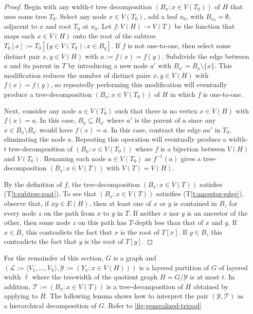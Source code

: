 \documentclass{patmorin}
\newcommand{\tref}[1]{(T\ref{t:#1})}
\begin{document}
\begin{proof}
  Begin with any width-$t$ tree decomposition $(B_x:x\in V(T_0))$ of $H$ that uses some tree $T_0$.  Select any node $x\in V(T_0)$, add a leaf $x_0$, with $B_{x_0}=\emptyset$, adjacent to $x$ and root $T_0$ at $x_0$.  Let $f:V(H)\to V(T)$ be the function that maps each $x\in V(H)$ onto the root of the subtree $T_0[x]:=T_0[\{y\in V(T_0): x\in B_y]$.  If $f$ is not one-to-one, then select some distinct pair $x,y\in V(H)$ with $a:=f(x)=f(y)$.  Subdivide the edge between $a$ and its parent in $T$ by introducing a new node $a'$ with $B_{a'}=B_{a}\setminus\{x\}$.  This modification reduces the number of distinct pairs $x,y\in V(H)$ with $f(x)=f(y)$, so repeatedly performing this modification will eventually produce a tree-decomposition $(B_x:x\in V(T_0))$ of $H$ in which $f$ is one-to-one.
  
  Next, consider any node $a\in V(T_0)$ such that there is no vertex $x\in V(H)$ with $f(x)=a$.  In this case, $B_{a}\subseteq B_{a'}$ where $a'$ is the parent of $a$ since any $x\in B_a\setminus B_{a'}$ would have $f(x)=a$.  In this case, contract the edge $aa'$ in $T_0$, eliminating the node $a$.  Repeating this operation will eventually produce a width-$t$ tree-decomposition of $(B_x:x\in V(T_0))$ where $f$ is a bijection between $V(H)$ and $V(T_0)$.  Renaming each node $a\in V(T_0)$ as $f^{-1}(a)$ gives a tree-decomposition $(B_x:x\in V(T))$ with $V(T)=V(H)$.  
  
  By the definition of $f$, the tree-decomposition $(B_x:x\in V(T))$ satisfies \tref{subtree-root}.  To see that $(B_x:x\in V(T))$ satisifies \tref{ancestor-edge}, observe that, if $xy\in E(H)$, then at least one of $x$ or $y$ is contained in $B_z$ for every node $z$ on the path from $x$ to $y$ in $T$.  If neither $x$ nor $y$ is an ancestor of the other, then some node $z$ on this path has $T$-depth less than that of $x$ and $y$.  If $x\in B_z$ this contradicts the fact that $x$ is the root of $T[x]$.  If $y\in B_z$ this contradicts the fact that $y$ is the root of $T[y]$.
\end{proof}


For the remainder of this section, $G$ is a graph and $(\mathcal{L}:=\langle V_1,\ldots,V_h\rangle,\mathcal{Y}:=(Y_x: x\in V(H)))$ is a layered partition of $G$ of layered width $\ell$ where the treewidth of the quotient graph $H=G/\mathcal{Y}$ is at most $t$.  In addition, $\mathcal{T}:=(B_x:x\in V(T))$ is a tree-decomposition of $H$ obtained by applying  to $H$.  The following lemma shows how to interpret the pair $(\mathcal{Y},\mathcal{T})$ as a hierarchical decomposition of $G$.  Refer to \cref{fig:generalized-tripod}
\end{document}
